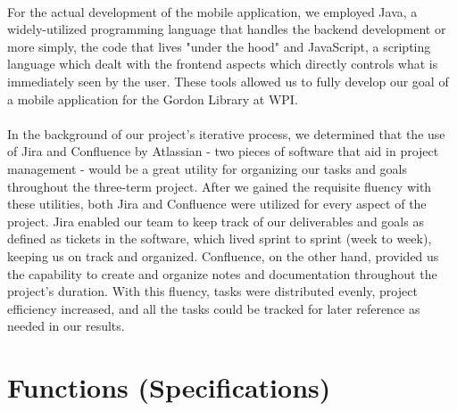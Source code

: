     \paragraph{}
    For the actual development of the mobile application, we employed Java, a widely-utilized programming language that handles the backend development or more simply, the code that lives "under the hood" and JavaScript, a scripting language which dealt with the frontend aspects which directly controls what is immediately seen by the user. These tools allowed us to fully develop our goal of a mobile application for the Gordon Library at WPI.

    \paragraph{}
    In the background of our project's iterative process, we determined that the use of Jira and Confluence by Atlassian - two pieces of software that aid in project management - would be a great utility for organizing our tasks and goals throughout the three-term project. After we gained the requisite fluency with these utilities, both Jira and Confluence were utilized for every aspect of the project. Jira enabled our team to keep track of our deliverables and goals as defined as tickets in the software, which lived sprint to sprint (week to week), keeping us on track and organized. Confluence, on the other hand, provided us the capability to create and organize notes and documentation throughout the project's duration. With this fluency, tasks were distributed evenly, project efficiency increased, and all the tasks could be tracked for later reference as needed in our results.
    \newpage
    
    
   \section{Functions (Specifications)}
